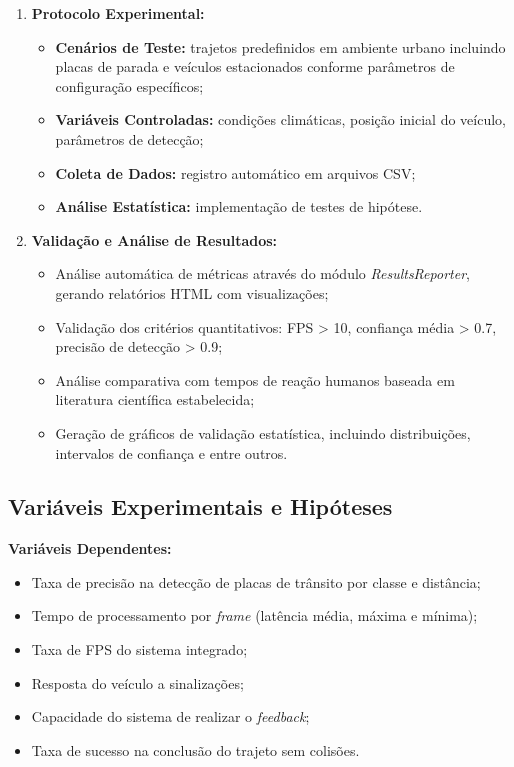 \documentclass[
	12pt,				%
	oneside, %
	a4paper,			%
	english,			%
	french,				%
	spanish,			%
	brazil				%
	]{abntex2}
\begin{document}
\begin{enumerate}
    \item \textbf{Protocolo Experimental:}
    \begin{itemize}
    \item \textbf{Cenários de Teste:} trajetos predefinidos em ambiente urbano incluindo placas de parada e veículos estacionados conforme parâmetros de configuração específicos;
    \item \textbf{Variáveis Controladas:} condições climáticas, posição inicial do veículo, parâmetros de detecção;
    \item \textbf{Coleta de Dados:} registro automático em arquivos CSV;
    \item \textbf{Análise Estatística:} implementação de testes de hipótese.
    \end{itemize}
    
    \item \textbf{Validação e Análise de Resultados:}
    \begin{itemize}
    \item Análise automática de métricas através do módulo \textit{ResultsReporter}, gerando relatórios HTML com visualizações;
    \item Validação dos critérios quantitativos: FPS > 10, confiança média > 0.7, precisão de detecção > 0.9;
    \item Análise comparativa com tempos de reação humanos baseada em literatura científica estabelecida;
    \item Geração de gráficos de validação estatística, incluindo distribuições, intervalos de confiança e entre outros.
    \end{itemize}
\end{enumerate}

\subsection{Variáveis Experimentais e Hipóteses}

\textbf{Variáveis Dependentes:}
\begin{itemize}
\item Taxa de precisão na detecção de placas de trânsito por classe e distância;
\item Tempo de processamento por \textit{frame} (latência média, máxima e mínima);
\item Taxa de FPS do sistema integrado;
\item Resposta do veículo a sinalizações;
\item Capacidade do sistema de realizar o \textit{feedback};
\item Taxa de sucesso na conclusão do trajeto sem colisões.
\end{itemize}
\end{document}
